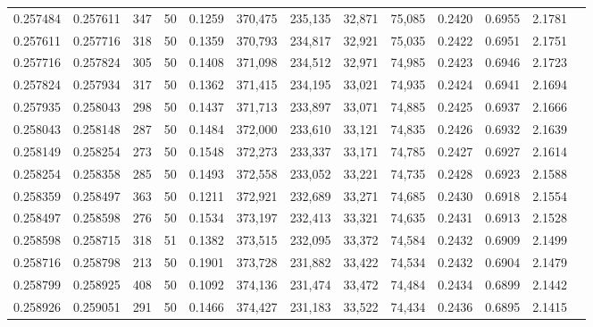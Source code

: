\begin{tabular}{rrrrrrrrrrrrr}
0.257484 & 0.257611 &   347 &  50 &                                     0.1259 & 370,475 & 235,135 &  32,871 &  75,085 & 0.2420 & 0.6955 & 2.1781 \\
0.257611 & 0.257716 &   318 &  50 &                                     0.1359 & 370,793 & 234,817 &  32,921 &  75,035 & 0.2422 & 0.6951 & 2.1751 \\
0.257716 & 0.257824 &   305 &  50 &                                     0.1408 & 371,098 & 234,512 &  32,971 &  74,985 & 0.2423 & 0.6946 & 2.1723 \\
0.257824 & 0.257934 &   317 &  50 &                                     0.1362 & 371,415 & 234,195 &  33,021 &  74,935 & 0.2424 & 0.6941 & 2.1694 \\
0.257935 & 0.258043 &   298 &  50 &                                     0.1437 & 371,713 & 233,897 &  33,071 &  74,885 & 0.2425 & 0.6937 & 2.1666 \\
0.258043 & 0.258148 &   287 &  50 &                                     0.1484 & 372,000 & 233,610 &  33,121 &  74,835 & 0.2426 & 0.6932 & 2.1639 \\
0.258149 & 0.258254 &   273 &  50 &                                     0.1548 & 372,273 & 233,337 &  33,171 &  74,785 & 0.2427 & 0.6927 & 2.1614 \\
0.258254 & 0.258358 &   285 &  50 &                                     0.1493 & 372,558 & 233,052 &  33,221 &  74,735 & 0.2428 & 0.6923 & 2.1588 \\
0.258359 & 0.258497 &   363 &  50 &                                     0.1211 & 372,921 & 232,689 &  33,271 &  74,685 & 0.2430 & 0.6918 & 2.1554 \\
0.258497 & 0.258598 &   276 &  50 &                                     0.1534 & 373,197 & 232,413 &  33,321 &  74,635 & 0.2431 & 0.6913 & 2.1528 \\
0.258598 & 0.258715 &   318 &  51 &                                     0.1382 & 373,515 & 232,095 &  33,372 &  74,584 & 0.2432 & 0.6909 & 2.1499 \\
0.258716 & 0.258798 &   213 &  50 &                                     0.1901 & 373,728 & 231,882 &  33,422 &  74,534 & 0.2432 & 0.6904 & 2.1479 \\
0.258799 & 0.258925 &   408 &  50 &                                     0.1092 & 374,136 & 231,474 &  33,472 &  74,484 & 0.2434 & 0.6899 & 2.1442 \\
0.258926 & 0.259051 &   291 &  50 &                                     0.1466 & 374,427 & 231,183 &  33,522 &  74,434 & 0.2436 & 0.6895 & 2.1415 \\

\end{tabular}
